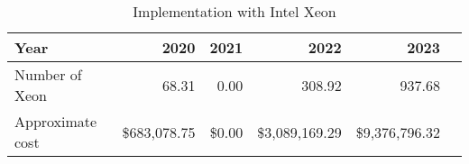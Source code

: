 \tiny \begin{longtable} { |p{}  |r  |r  |r  |r  |r |} 
\caption{Implementation with Intel Xeon \label{tab:Xeon}}\\ 
\hline 
\textbf{Year}&\textbf{2020}&\textbf{2021}&\textbf{2022}&\textbf{2023} \\ \hline
{Number of Xeon}&{68.31}&{0.00}&{308.92}&{937.68} \\ \hline
{Approximate cost}&{\$683,078.75}&{\$0.00}&{\$3,089,169.29}&{\$9,376,796.32} \\ \hline
\end{longtable} \normalsize
